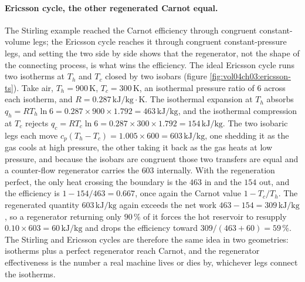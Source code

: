 \paragraph{Ericsson cycle, the other regenerated Carnot equal.} The Stirling
example reached the Carnot efficiency through congruent constant-volume legs; the
Ericsson cycle reaches it through congruent constant-pressure legs, and setting
the two side by side shows that the regenerator, not the shape of the connecting
process, is what wins the efficiency. The ideal Ericsson cycle runs two isotherms
at $T_h$ and $T_c$ closed by two isobars (figure
\ref{fig:vol04ch03:ericsson-ts}). Take air, $T_h = 900\,\si{\kelvin}$, $T_c =
300\,\si{\kelvin}$, an isothermal pressure ratio of $6$ across each isotherm, and
$R = 0.287\,\text{kJ}/\text{kg}\cdot\text{K}$. The isothermal expansion at $T_h$
absorbs $q_{h} = R T_h \ln 6 = 0.287 \times 900 \times 1.792 = 463\,\text{kJ}/
\text{kg}$, and the isothermal compression at $T_c$ rejects $q_{c} = R T_c \ln 6
= 0.287 \times 300 \times 1.792 = 154\,\text{kJ}/\text{kg}$. The two isobaric
legs each move $c_p(T_h - T_c) = 1.005 \times 600 = 603\,\text{kJ}/\text{kg}$,
one shedding it as the gas cools at high pressure, the other taking it back as the
gas heats at low pressure, and because the isobars are congruent those two
transfers are equal and a counter-flow regenerator carries the $603$ internally.
With the regeneration perfect, the only heat crossing the boundary is the $463$ in
and the $154$ out, and the efficiency is $1 - 154/463 = 0.667$, once again the
Carnot value $1 - T_c/T_h$. The regenerated quantity $603\,\text{kJ}/\text{kg}$
again exceeds the net work $463 - 154 = 309\,\text{kJ}/\text{kg}$, so a
regenerator returning only $90\,\%$ of it forces the hot reservoir to resupply
$0.10 \times 603 = 60\,\text{kJ}/\text{kg}$ and drops the efficiency toward
$309/(463 + 60) = 59\,\%$. The Stirling and Ericsson cycles are therefore the
same idea in two geometries: isotherms plus a perfect regenerator reach Carnot,
and the regenerator effectiveness is the number a real machine lives or dies by,
whichever legs connect the isotherms.



